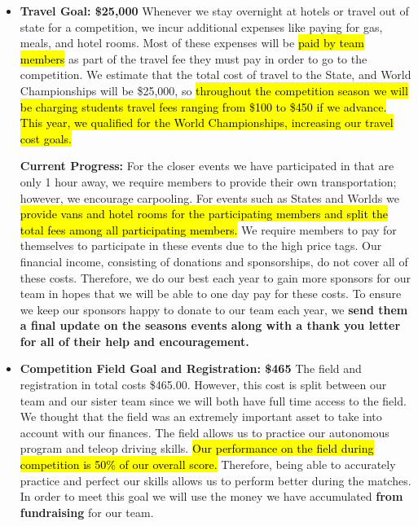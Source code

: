 \begin{itemize}
  \item \textbf{\Large Travel Goal: \$25,000 }
  \newline 
  Whenever we stay overnight at hotels or travel out of state for a competition, we incur additional expenses like paying for gas, meals, and hotel rooms. Most of these expenses will be \hl{paid by team members} as part of the travel fee they must pay in order to go to the competition. We estimate that the total cost of travel to the State, and World Championships will be \$25,000, so \hl{throughout the competition season we will be charging students travel fees ranging from \$100 to \$450 if we advance. This year, we qualified for the World Championships, increasing our travel cost goals.}
  
  \textbf{Current Progress: }
  For the closer events we have participated in that are only 1 hour away, we require members to provide their own transportation; however, we encourage carpooling. For events such as States and Worlds we \hl{provide vans and hotel rooms for the participating members and split the total fees among all participating members.} We require members to pay for themselves to participate in these events due to the high price tags. Our financial income, consisting of donations and sponsorships, do not cover all of these costs. Therefore, we do our best each year to gain more sponsors for our team in hopes that we will be able to one day pay for these costs. To ensure we keep our sponsors happy to donate to our team each year, we \textbf{send them a final update on the seasons events along with a thank you letter for all of their help and encouragement.} 
  \item \textbf{\Large Competition Field Goal and Registration: \$465}
  \newline 
   The field and registration in total costs \$465.00. However, this cost is split between our team and our sister team since we will both have full time access to the field. We thought that the field was an extremely important asset to take into account with our finances. The field allows us to practice our autonomous program and teleop driving skills. \hl{Our performance on the field during competition is 50\% of our overall score.} Therefore, being able to accurately practice and perfect our skills allows us to perform better during the matches. In order to meet this goal we will use the money we have accumulated \textbf{from fundraising} for our team.
  \newline 

\end{itemize}

